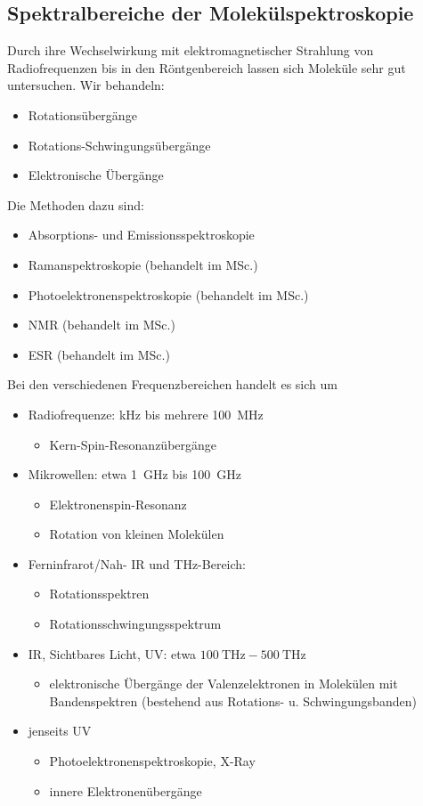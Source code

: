 	\subsection{Spektralbereiche der Molekülspektroskopie}
	Durch ihre Wechselwirkung mit elektromagnetischer Strahlung von Radiofrequenzen bis in den Röntgenbereich lassen sich Moleküle sehr gut untersuchen. Wir behandeln:
	\begin{itemize}
		\item Rotationsübergänge
		\item Rotations-Schwingungsübergänge
		\item Elektronische Übergänge
	\end{itemize}
	Die Methoden dazu sind:
	\begin{itemize}
		\item Absorptions- und Emissionsspektroskopie
		\item Ramanspektroskopie (behandelt im MSc.)
		\item Photoelektronenspektroskopie (behandelt im MSc.)
		\item NMR (behandelt im MSc.)
		\item ESR (behandelt im MSc.)
	\end{itemize}
	Bei den verschiedenen Frequenzbereichen handelt es sich um
	\begin{itemize}
		\item Radiofrequenze: \unit{\kilo \hertz} bis mehrere \SI{100}{\mega \hertz}
			\begin{itemize}[label=$ \to$]
				\item Kern-Spin-Resonanzübergänge
			\end{itemize}
		\item Mikrowellen: etwa \SI{1}{\giga \hertz} bis \SI{100}{\giga \hertz}
			\begin{itemize}[label=$ \to$ ]
				\item Elektronenspin-Resonanz
				\item Rotation von kleinen Molekülen
			\end{itemize}
		\item Ferninfrarot/Nah- IR und \unit{\tera\hertz}-Bereich:
			\begin{itemize}[label=$ \to$]
				\item Rotationsspektren
				\item Rotationsschwingungsspektrum
			\end{itemize}
		\item IR, Sichtbares Licht, UV: etwa $\SI{100}{\tera \hertz} - \SI{500}{\tera \hertz}$
			\begin{itemize}[label=$ \to$]
				\item elektronische Übergänge der Valenzelektronen in Molekülen mit Bandenspektren (bestehend aus Rotations- u. Schwingungsbanden)
			\end{itemize} 
		\item jenseits UV
			\begin{itemize}[label=$\to$]
				\item Photoelektronenspektroskopie, X-Ray
				\item innere Elektronenübergänge
			\end{itemize}
	\end{itemize}
